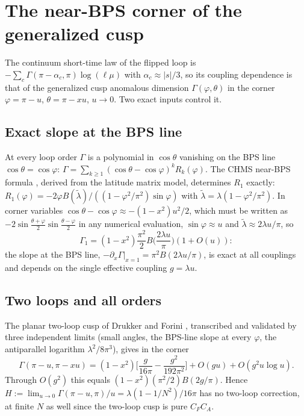 \section{The near-BPS corner of the generalized cusp}
\label{sec:corner}

The continuum short-time law of the flipped loop is $-\sum_c\Gamma(\pi-\alpha_c,\pi)\log(\ell\mu)$ with
$\alpha_c\approx|s|/3$, so its coupling dependence is that of the generalized cusp anomalous dimension
$\Gamma(\varphi,\theta)$ in the corner $\varphi=\pi-u$, $\theta=\pi-xu$, $u\to0$. Two exact inputs control it.

\subsection{Exact slope at the BPS line}

At every loop order $\Gamma$ is a polynomial in $\cos\theta$ vanishing on the BPS line $\cos\theta=\cos\varphi$:
$\Gamma=\sum_{k\ge1}(\cos\theta-\cos\varphi)^kR_k(\varphi)$. The CHMS near-BPS formula \cite{CHMS}, derived from
the latitude matrix model, determines $R_1$ exactly:
$R_1(\varphi)=-2\varphi B(\tilde\lambda)/((1-\varphi^2/\pi^2)\sin\varphi)$ with $\tilde\lambda=\lambda(1-\varphi^2/\pi^2)$.
In corner variables $\cos\theta-\cos\varphi\approx-(1-x^2)u^2/2$, which must be written as
$-2\sin\frac{\theta+\varphi}2\sin\frac{\theta-\varphi}2$ in any numerical evaluation, $\sin\varphi\approx u$ and
$\tilde\lambda\approx2\lambda u/\pi$, so
\begin{equation}
\Gamma_1=(1-x^2)\frac{\pi^2}2B\Big(\frac{2\lambda u}\pi\Big)(1+O(u)):
\end{equation}
the slope at the BPS line, $-\partial_x\Gamma|_{x=1}=\pi^2B(2\lambda u/\pi)$, is exact at all couplings and depends
on the single effective coupling $g=\lambda u$.

\subsection{Two loops and all orders}

The planar two-loop cusp of Drukker and Forini \cite{DrukkerForini}, transcribed and validated by three
independent limits (small angles, the BPS-line slope at every $\varphi$, the antiparallel logarithm
$\lambda^2/8\pi^3$), gives in the corner
\begin{equation}
\Gamma(\pi-u,\pi-xu)=(1-x^2)\Big[\frac g{16\pi}-\frac{g^2}{192\pi^2}\Big]+O(gu)+O(g^2u\log u).
\end{equation}
Through $O(g^2)$ this equals $(1-x^2)(\pi^2/2)B(2g/\pi)$. Hence $H:=\lim_{u\to0}\Gamma(\pi-u,\pi)/u=\lambda(1-1/N^2)/16\pi$
has no two-loop correction, at finite $N$ as well since the two-loop cusp is pure $C_FC_A$.

